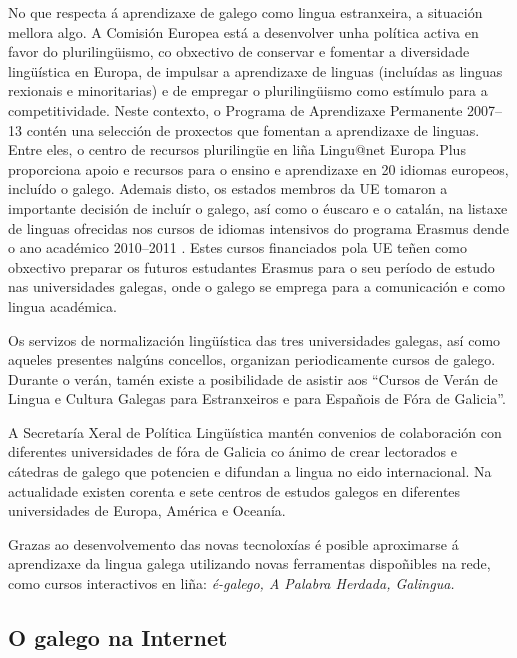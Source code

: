 \begin{multicols}{2}
No que respecta á aprendizaxe de galego como lingua estranxeira, a situación mellora algo. A Comisión Europea está a desenvolver unha política activa en favor do plurilingüismo, co obxectivo de conservar e fomentar a diversidade lingüística en Europa, de impulsar a aprendizaxe de linguas (incluídas as linguas rexionais e minoritarias) e de empregar o plurilingüismo como estímulo para a competitividade. Neste contexto, o Programa de Aprendizaxe Permanente 2007--13 contén una selección de proxectos que fomentan a aprendizaxe de linguas. Entre eles, o centro de recursos plurilingüe en liña  Lingu@net Europa Plus \cite{GAL-Nota14}  proporciona apoio e recursos para o ensino e aprendizaxe en 20 idiomas europeos, incluído o galego. Ademais disto, os estados membros da UE tomaron a importante decisión de incluír o galego, así como o éuscaro e o catalán, na listaxe de linguas ofrecidas nos cursos de idiomas intensivos do programa Erasmus dende o ano académico 2010--2011 \cite{GAL-Nota15}. Estes cursos financiados pola UE teñen como obxectivo preparar os futuros estudantes Erasmus para o seu período de estudo nas universidades galegas, onde o galego se emprega para a comunicación e como lingua académica. 


Os servizos de normalización lingüística das tres universidades galegas, así como aqueles presentes nalgúns concellos, organizan periodicamente cursos de galego. Durante o verán, tamén existe a posibilidade de asistir aos “Cursos de Verán de Lingua e Cultura Galegas para Estranxeiros e para Españois de Fóra de Galicia”. 

A Secretaría Xeral de Política Lingüística mantén convenios de colaboración con diferentes universidades de fóra de Galicia co ánimo de crear lectorados e cátedras de galego que potencien e difundan a lingua no eido internacional. Na actualidade existen corenta e sete centros de estudos galegos en diferentes universidades de Europa, América e Oceanía.

Grazas ao desenvolvemento das novas tecnoloxías é posible aproximarse á aprendizaxe da lingua galega utilizando novas ferramentas dispoñibles na rede, como cursos interactivos en liña: \textit{é-galego, A Palabra Herdada, Galingua.}

\subsection{O galego na Internet}


\end{multicols}
